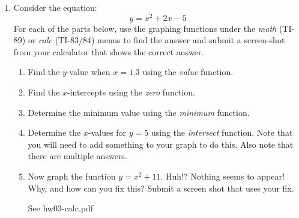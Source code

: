 \documentclass[letterpaper,12pt,fleqn]{article}
\begin{document}
\begin{enumerate}
\item Consider the equation:
\[y=x^2+2x-5\]
For each of the parts below, use the graphing functions under the \emph{math}
(TI-89) or \emph{calc} (TI-83/84) menus to find the answer and submit a
screen-shot from your calculator that shows the correct answer.
\begin{enumerate}
\item Find the $y$-value when $x=1.3$ using the \emph{value} function.
\item Find the $x$-intercepts using the \emph{zero} function.
\item Determine the minimum value using the \emph{minimum} function.
\item Determine the $x$-values for $y=5$ using the \emph{intersect} function.
Note that you will need to add something to your graph to do this. Also note
that there are multiple answers.
\item Now graph the function $y=x^2+11$. Huh!? Nothing seems to appear! Why,
and how can you fix this? Submit a screen shot that uses your fix.

\bigskip

See hw03-calc.pdf
\end{enumerate}

\end{enumerate}
\end{document}
